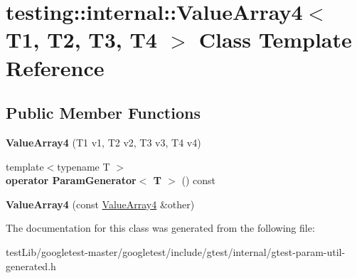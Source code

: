 \hypertarget{classtesting_1_1internal_1_1ValueArray4}{}\section{testing\+:\+:internal\+:\+:Value\+Array4$<$ T1, T2, T3, T4 $>$ Class Template Reference}
\label{classtesting_1_1internal_1_1ValueArray4}
\subsection*{Public Member Functions}
\begin{DoxyCompactItemize}
\item 
\mbox{\label{classtesting_1_1internal_1_1ValueArray4_a5288bbb1a3149842ab13d689cf1fd48f}} 
{\bfseries Value\+Array4} (T1 v1, T2 v2, T3 v3, T4 v4)
\item 
\mbox{\label{classtesting_1_1internal_1_1ValueArray4_aef21f582b20423f5fb8515d9879ad557}} 
{\footnotesize template$<$typename T $>$ }\\{\bfseries operator Param\+Generator$<$ T $>$} () const
\item 
\mbox{\label{classtesting_1_1internal_1_1ValueArray4_a3703e95dc214c47d705cf68fdf2e262b}} 
{\bfseries Value\+Array4} (const \hyperlink{classtesting_1_1internal_1_1ValueArray4}{Value\+Array4} \&other)
\end{DoxyCompactItemize}


The documentation for this class was generated from the following file\+:\begin{DoxyCompactItemize}
\item 
test\+Lib/googletest-\/master/googletest/include/gtest/internal/gtest-\/param-\/util-\/generated.\+h\end{DoxyCompactItemize}

